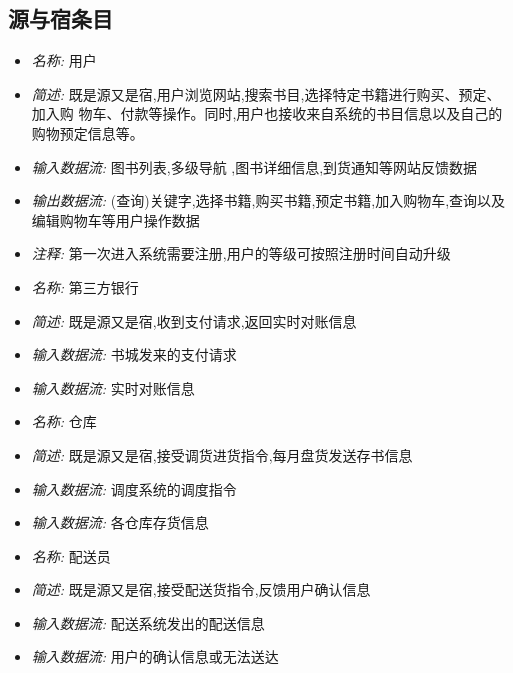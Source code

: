 \documentclass{article}
\begin{document}
\begin{CJK*}{UTF8}{gbsn}
\vspace{-1mm}

\subsection{源与宿条目}
\begin{itemize}
\item \textit{名称: } 用户
\item \textit{简述: } 既是源又是宿,用户浏览网站,搜索书目,选择特定书籍进行购买、预定、加入购 物车、付款等操作。同时,用户也接收来自系统的书目信息以及自己的购物预定信息等。 
\item \textit{输入数据流: }图书列表,多级导航 ,图书详细信息,到货通知等网站反馈数据 
\item \textit{输出数据流: } (查询)关键字,选择书籍,购买书籍,预定书籍,加入购物车,查询以及 编辑购物车等用户操作数据
\item \textit{注释: } 第一次进入系统需要注册,用户的等级可按照注册时间自动升级

\end{itemize}


\vspace{-1mm}


\begin{itemize}
\item \textit{名称: } 第三方银行
\item \textit{简述: } 既是源又是宿,收到支付请求,返回实时对账信息
\item \textit{输入数据流: } 书城发来的支付请求 
\item \textit{输入数据流: } 实时对账信息

\end{itemize}


\vspace{-1mm}


\begin{itemize}
\item \textit{名称: } 仓库
\item \textit{简述: } 既是源又是宿,接受调货进货指令,每月盘货发送存书信息 
\item \textit{输入数据流: } 调度系统的调度指令
\item \textit{输入数据流: } 各仓库存货信息

\end{itemize}


\vspace{-1mm}


\begin{itemize}
\item \textit{名称: } 配送员
\item \textit{简述: } 既是源又是宿,接受配送货指令,反馈用户确认信息 
\item \textit{输入数据流: } 配送系统发出的配送信息
\item \textit{输入数据流: } 用户的确认信息或无法送达


\end{itemize}
\end{CJK*}
\end{document}
